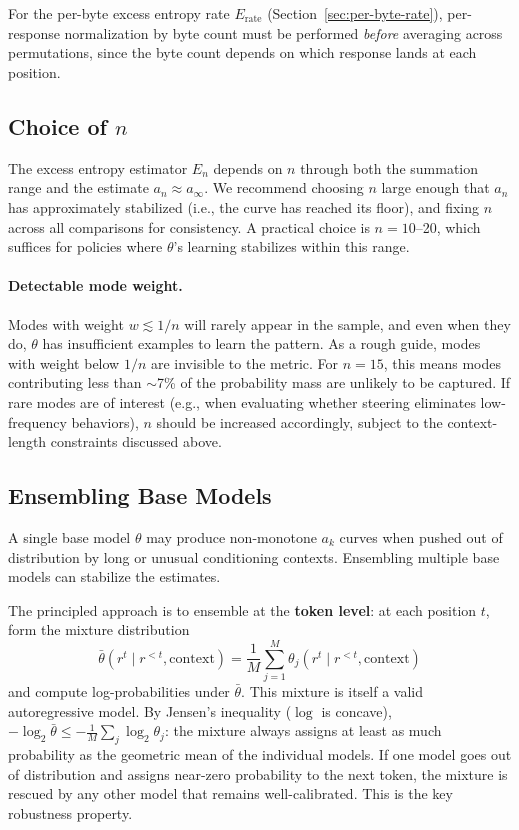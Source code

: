 \documentclass[11pt]{article}
\begin{document}
For the per-byte excess entropy rate $E_{\mathrm{rate}}$ (Section~\ref{sec:per-byte-rate}), per-response normalization by byte count must be performed \emph{before} averaging across permutations, since the byte count depends on which response lands at each position.

\subsection{Choice of $n$}

The excess entropy estimator $\hat{E}_n$ depends on $n$ through both the summation range and the estimate $a_n \approx a_\infty$. We recommend choosing $n$ large enough that $a_n$ has approximately stabilized (i.e., the curve has reached its floor), and fixing $n$ across all comparisons for consistency. A practical choice is $n = 10$--20, which suffices for policies where $\theta$'s learning stabilizes within this range.

\paragraph{Detectable mode weight.} Modes with weight $w \lesssim 1/n$ will rarely appear in the sample, and even when they do, $\theta$ has insufficient examples to learn the pattern. As a rough guide, modes with weight below $1/n$ are invisible to the metric. For $n = 15$, this means modes contributing less than $\sim$7\% of the probability mass are unlikely to be captured. If rare modes are of interest (e.g., when evaluating whether steering eliminates low-frequency behaviors), $n$ should be increased accordingly, subject to the context-length constraints discussed above.

\subsection{Ensembling Base Models}\label{sec:ensemble}

A single base model $\theta$ may produce non-monotone $a_k$ curves when pushed out of distribution by long or unusual conditioning contexts. Ensembling multiple base models can stabilize the estimates.

The principled approach is to ensemble at the \textbf{token level}: at each position $t$, form the mixture distribution
\begin{equation}
    \bar{\theta}(r^t \mid r^{<t}, \mathrm{context}) = \frac{1}{M}\sum_{j=1}^{M} \theta_j(r^t \mid r^{<t}, \mathrm{context})
\end{equation}
and compute log-probabilities under $\bar{\theta}$. This mixture is itself a valid autoregressive model. By Jensen's inequality ($\log$ is concave), $-\log_2 \bar{\theta} \leq -\frac{1}{M}\sum_j \log_2 \theta_j$: the mixture always assigns at least as much probability as the geometric mean of the individual models. If one model goes out of distribution and assigns near-zero probability to the next token, the mixture is rescued by any other model that remains well-calibrated. This is the key robustness property.
\end{document}
